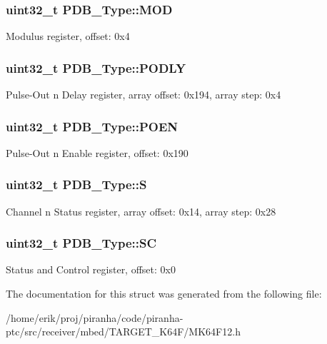 \subsubsection[{\texorpdfstring{M\+OD}{MOD}}]{ uint32\+\_\+t P\+D\+B\+\_\+\+Type\+::\+M\+OD}\hypertarget{structPDB__Type_ae69113e63275302871696253eb33d1aa}{}\label{structPDB__Type_ae69113e63275302871696253eb33d1aa}
Modulus register, offset\+: 0x4 
\subsubsection[{\texorpdfstring{P\+O\+D\+LY}{PODLY}}]{ uint32\+\_\+t P\+D\+B\+\_\+\+Type\+::\+P\+O\+D\+LY}\hypertarget{structPDB__Type_a510c6f171ae54942cc2dace9ebf4f6fa}{}\label{structPDB__Type_a510c6f171ae54942cc2dace9ebf4f6fa}
Pulse-\/\+Out n Delay register, array offset\+: 0x194, array step\+: 0x4 
\subsubsection[{\texorpdfstring{P\+O\+EN}{POEN}}]{ uint32\+\_\+t P\+D\+B\+\_\+\+Type\+::\+P\+O\+EN}\hypertarget{structPDB__Type_a5cea78677c2f36e8ad10791dfcb9b086}{}\label{structPDB__Type_a5cea78677c2f36e8ad10791dfcb9b086}
Pulse-\/\+Out n Enable register, offset\+: 0x190 
\subsubsection[{\texorpdfstring{S}{S}}]{ uint32\+\_\+t P\+D\+B\+\_\+\+Type\+::S}\hypertarget{structPDB__Type_ac3e33b249de9772accd3ea93c70ea9a3}{}\label{structPDB__Type_ac3e33b249de9772accd3ea93c70ea9a3}
Channel n Status register, array offset\+: 0x14, array step\+: 0x28 
\subsubsection[{\texorpdfstring{SC}{SC}}]{ uint32\+\_\+t P\+D\+B\+\_\+\+Type\+::\+SC}\hypertarget{structPDB__Type_a27b752c3fb14fa47cda9b911dda18eb5}{}\label{structPDB__Type_a27b752c3fb14fa47cda9b911dda18eb5}
Status and Control register, offset\+: 0x0 

The documentation for this struct was generated from the following file\+:\begin{DoxyCompactItemize}
\item 
/home/erik/proj/piranha/code/piranha-\/ptc/src/receiver/mbed/\+T\+A\+R\+G\+E\+T\+\_\+\+K64\+F/M\+K64\+F12.\+h\end{DoxyCompactItemize}
